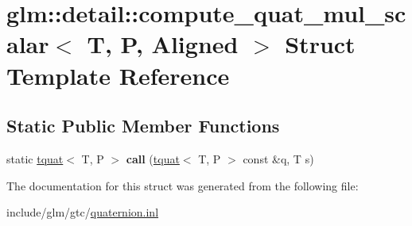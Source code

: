 \hypertarget{structglm_1_1detail_1_1compute__quat__mul__scalar}{}\section{glm\+:\+:detail\+:\+:compute\+\_\+quat\+\_\+mul\+\_\+scalar$<$ T, P, Aligned $>$ Struct Template Reference}
\label{structglm_1_1detail_1_1compute__quat__mul__scalar}
\subsection*{Static Public Member Functions}
\begin{DoxyCompactItemize}
\item 
\mbox{\label{structglm_1_1detail_1_1compute__quat__mul__scalar_a67ddc713e670e348caba9de92480446f}} 
static \hyperlink{structglm_1_1tquat}{tquat}$<$ T, P $>$ {\bfseries call} (\hyperlink{structglm_1_1tquat}{tquat}$<$ T, P $>$ const \&q, T s)
\end{DoxyCompactItemize}


The documentation for this struct was generated from the following file\+:\begin{DoxyCompactItemize}
\item 
include/glm/gtc/\hyperlink{gtc_2quaternion_8inl}{quaternion.\+inl}\end{DoxyCompactItemize}
